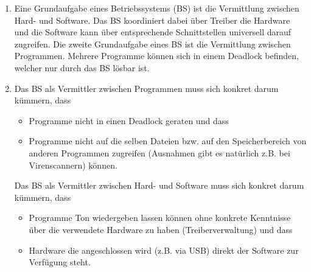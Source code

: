 \documentclass[ngerman]{fbi-aufgabenblatt}
\begin{document}



\begin{enumerate}
	\item Eine Grundaufgabe eines Betriebssystems (BS) ist die Vermittlung zwischen Hard- und Software. Das BS koordiniert dabei über Treiber die Hardware und die Software kann über entsprechende Schnittstellen universell darauf zugreifen.
	Die zweite Grundaufgabe eines BS ist die Vermittlung zwischen Programmen. Mehrere Programme können sich in einem Deadlock befinden, welcher nur durch das BS lösbar ist.
	
	\item Das BS als Vermittler zwischen Programmen muss sich konkret darum kümmern, dass
	\begin{itemize}
		\item Programme nicht in einen Deadlock geraten und dass
		\item Programme nicht auf die selben Dateien bzw. auf den Speicherbereich von anderen Programmen zugreifen (Ausnahmen gibt es natürlich z.B. bei Virenscannern) können.
	\end{itemize}
	Das BS als Vermittler zwischen Hard- und Software muss sich konkret
darum kümmern, dass
	\begin{itemize}
		\item Programme Ton wiedergeben lassen können ohne konkrete Kenntnisse über die verwendete Hardware zu haben (Treiberverwaltung) und dass
		\item Hardware die angeschlossen wird (z.B. via USB) direkt der Software zur Verfügung steht.
	\end{itemize}
\end{enumerate}

\end{document}
